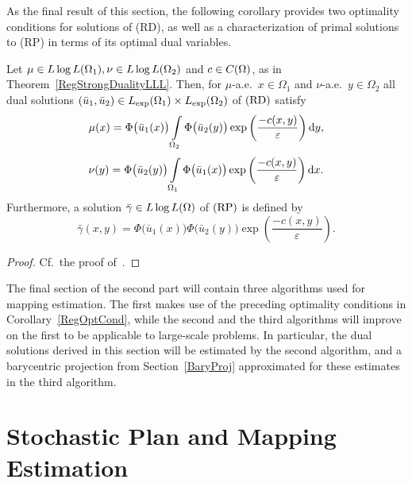 As the final result of this section, the following corollary provides two optimality conditions for solutions of (RD), as well as a characterization of primal solutions to (RP) in terms of its optimal dual variables.

\begin{corollary}\label{RegOptCond}
	Let $\mu \in \LLL[\Omega_1], \nu \in \LLL[\Omega_2]$ and $c \in \CF{\Omega}$, as in Theorem~\ref{RegStrongDualityLLL}. Then, for $\mu$-a.e.\ $x \in \Omega_1$ and $\nu$-a.e.\ $y \in \Omega_2$ all dual solutions $(\bar{u}_1, \bar{u}_2) \in \Lexp[\Omega_1] \times \Lexp[\Omega_2]$ of$\text{\normalfont\ (RD)}$ satisfy
	\begin{equation}\label{OptCond1}
		\mu(x) = \Phi\big( \bar{u}_1(x) \big) \int\limits_{\Omega_2} \Phi\big( \bar{u}_2(y) \big) \exp \left( \frac{- c(x, y)}{\varepsilon} \right)\D[y],
	\end{equation}
	\begin{equation}\label{OptCond2}
		\nu(y) = \Phi\big( \bar{u}_2(y) \big) \int\limits_{\Omega_1} \Phi\big( \bar{u}_1(x) \big) \exp \left( \frac{- c(x, y)}{\varepsilon} \right)\D[x].
	\end{equation}
	Furthermore, a solution $\bar{\gamma} \in \LLL$ of$\text{\normalfont\ (RP)}$ is defined by
	\[ \bar{\gamma}(x, y) = \Phi\big( \bar{u}_1(x) \big) \Phi\big( \bar{u}_2(y) \big) \exp\left( \frac{- c(x, y)}{\varepsilon} \right). \]
\end{corollary}

\begin{proof}
	Cf.~the proof of\ \cite[Theorem~4.8]{Cla2021}.
\end{proof}

The final section of the second part will contain three algorithms used for mapping estimation. The first makes use of the preceding optimality conditions in Corollary~\ref{RegOptCond}, while the second and the third algorithms will improve on the first to be applicable to large-scale problems. In particular, the dual solutions derived in this section will be estimated by the second algorithm, and a barycentric projection from Section~\ref{BaryProj} approximated for these estimates in the third algorithm.

\section{Stochastic Plan and Mapping Estimation}\label{StoPlanAndMapEst}

